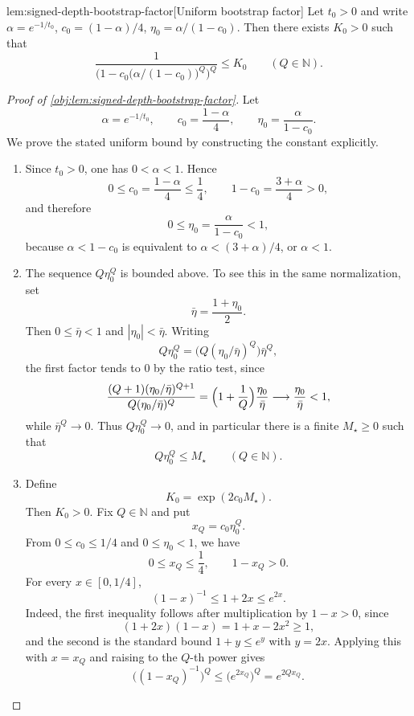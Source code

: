\documentclass[11pt]{article}
\begin{document}
\begin{lemmav}{lem:signed-depth-bootstrap-factor}[Uniform bootstrap factor]
Let \(t_0>0\) and write \(\alpha=e^{-1/t_0}\), \(c_0=(1-\alpha)/4\), \(\eta_0=\alpha/(1-c_0)\). Then there exists \(K_0>0\) such that
\[
\frac{1}{\bigl(1-c_0\bigl(\alpha/(1-c_0)\bigr)^{Q}\bigr)^{Q}}
\le
K_0
\qquad(Q\in\mathbb N).
\]
\end{lemmav}

\begin{proof}[Proof of \cref{obj:lem:signed-depth-bootstrap-factor}]
Let
\[
        \alpha=e^{-1/t_0},\qquad c_0=\frac{1-\alpha}{4},\qquad
        \eta_0=\frac{\alpha}{1-c_0}.
\]
We prove the stated uniform bound by constructing the constant explicitly.

\begin{enumerate}
\item Since \(t_0>0\), one has \(0<\alpha<1\). Hence
\[
        0\le c_0=\frac{1-\alpha}{4}\le \frac14,
        \qquad
        1-c_0=\frac{3+\alpha}{4}>0,
\]
and therefore
\[
        0\le \eta_0=\frac{\alpha}{1-c_0}<1,
\]
because \(\alpha<1-c_0\) is equivalent to \(\alpha<(3+\alpha)/4\), or \(\alpha<1\). %

\item The sequence \(Q\eta_0^Q\) is bounded above. To see this in the same normalization, set
\[
        \bar\eta=\frac{1+\eta_0}{2}.
\]
Then \(0\le \bar\eta<1\) and \(|\eta_0|<\bar\eta\). Writing
\[
        Q\eta_0^Q=\bigl(Q(\eta_0/\bar\eta)^Q\bigr)\bar\eta^Q,
\]
the first factor tends to \(0\) by the ratio test, since
\[
        \frac{(Q+1)(\eta_0/\bar\eta)^{Q+1}}
             {Q(\eta_0/\bar\eta)^Q}
        =\Bigl(1+\frac1Q\Bigr)\frac{\eta_0}{\bar\eta}
        \longrightarrow \frac{\eta_0}{\bar\eta}<1,
\]
while \(\bar\eta^Q\to0\). Thus \(Q\eta_0^Q\to0\), and in particular there is a finite \(M_\star\ge0\) such that
\[
        Q\eta_0^Q\le M_\star\qquad(Q\in\mathbb N).
\]

\item Define
\[
        K_0=\exp(2c_0M_\star).
\]
Then \(K_0>0\). Fix \(Q\in\mathbb N\) and put
\[
        x_Q=c_0\eta_0^Q.
\]
From \(0\le c_0\le1/4\) and \(0\le\eta_0<1\), we have
\[
        0\le x_Q\le \frac14,
        \qquad
        1-x_Q>0.
\]
For every \(x\in[0,1/4]\),
\[
        (1-x)^{-1}\le 1+2x\le e^{2x}.
\]
Indeed, the first inequality follows after multiplication by \(1-x>0\), since
\[
        (1+2x)(1-x)=1+x-2x^2\ge1,
\]
and the second is the standard bound \(1+y\le e^y\) with \(y=2x\). Applying this with \(x=x_Q\) and raising to the \(Q\)-th power gives
\[
        \bigl((1-x_Q)^{-1}\bigr)^Q
        \le \bigl(e^{2x_Q}\bigr)^Q
        =e^{2Qx_Q}.
\]


\end{enumerate}
\end{proof}
\end{document}
